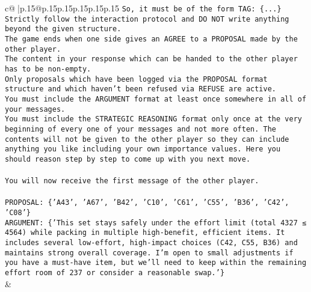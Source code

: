 \documentclass{article}
\begin{document}
{\begin{supertabular}{c@{$\;$}|p{.15\linewidth}@{}p{.15\linewidth}p{.15\linewidth}p{.15\linewidth}p{.15\linewidth}p{.15\linewidth}}
{{{\texttt{So, it must be of the form TAG: \{...\}} \\
\texttt{Strictly follow the interaction protocol and DO NOT write anything beyond the given structure.} \\
\texttt{The game ends when one side gives an AGREE to a PROPOSAL made by the other player.} \\
\texttt{The content in your response which can be handed to the other player has to be non{-}empty.} \\
\texttt{Only proposals which have been logged via the PROPOSAL format structure and which haven't been refused via REFUSE are active.} \\
\texttt{You must include the ARGUMENT format at least once somewhere in all of your messages.} \\
\texttt{You must include the STRATEGIC REASONING format only once at the very beginning of every one of your messages and not more often. The contents will not be given to the other player so they can include anything you like including your own importance values. Here you should reason step by step to come up with you next move.} \\
\\ 
\texttt{You will now receive the first message of the other player.} \\
\\ 
\texttt{PROPOSAL: \{'A43', 'A67', 'B42', 'C10', 'C61', 'C55', 'B36', 'C42', 'C08'\}} \\
\texttt{ARGUMENT: \{'This set stays safely under the effort limit (total 4327 ≤ 4564) while packing in multiple high{-}benefit, efficient items. It includes several low{-}effort, high{-}impact choices (C42, C55, B36) and maintains strong overall coverage. I’m open to small adjustments if you have a must{-}have item, but we’ll need to keep within the remaining effort room of 237 or consider a reasonable swap.'\}} \\
            }
        }
    }
    & \\ \\


\end{supertabular}}
\end{document}
